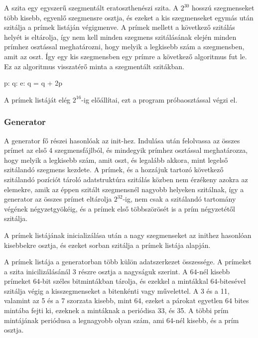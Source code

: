 A szita egy egyszerű szegmentált eratoszthenészi szita.
A $2^{30}$ hosszú szegmenseket több kisebb, egyenlő szegmensre osztja, és ezeket a kis szegmenseket
egymás után szitálja a prímek listáján végigmenve.
A prímek mellett a következő szitálás helyét is eltárolja, így nem kell minden szegmens szitálásának elején minden prímhez osztással meghatározni, hogy melyik a legkisebb szám a szegmensben, amit az oszt.
Így egy kis szegmensben egy prímre a következő algoritmus fut le.
Ez az algoritmus visszatérő minta a szegmentált szitákban.

\begin{algorithmic}[1]
\State p: 
\State q: 
\State e: 
	\State {}
	\State q = q + 2p
\EndWhile
\end{algorithmic}

A prímek listáját elég $2^{16}$-ig előállítai, ezt a program próbaosztással végzi el.

\subsubsection{Generator}

A generator fő részei hasonlóak az init-hez.
Indulása után felolvassa az összes prímet az első 4 szegmensfájlból, és mindegyik prímhez osztással meghatározza, hogy melyik a legkisebb szám, amit oszt, és legalább akkora, mint legelső
szitálandó szegmens kezdete.
A prímek, és a hozzájuk tartozó következő szitálandó
pozíciót tároló adatstruktúra szitálás közben
nem érzékeny azokra az elemekre, amik az éppen szitált szegmensnél
nagyobb helyeken szitálnak, így a generator
az összes prímet eltárolja $2^{32}$-ig, nem csak
a szitálandó tartomány végének négyzetgyökéig,
és a prímek első többszörösét is a prím
négyzetétől szitálja.

A prímek listájának inicializálása után
a nagy szegmenseket az inithez hasonlóan kisebbekre osztja,
és ezeket sorban szitálja a prímek listája alapján.

A prímek listája a generatorban több külön
adatszerkezet összessége. A prímeket a szita
inicilizálásánál 3 részre osztja a nagyságuk szerint.
A $64$-nél kisebb prímeket $64$-bit széles bitmintákban
tárolja, és ezekkel a mintákkal $64$-bitesével szitálja
végig a kisszegmenseket a bitenkénti vagy művelettel.
A 3 és a 11, valamint az 5 és a 7 szorzata kisebb, mint 64,
ezeket a párokat egyetlen $64$ bites mintába fejti ki,
ezeknek a mintáknak a periódisa 33, és 35.
A többi prím mintájának periódusa a legnagyobb olyan szám,
ami 64-nél kisebb, és a prím osztja.

